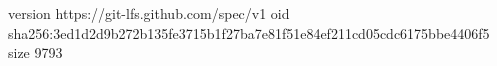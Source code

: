 version https://git-lfs.github.com/spec/v1
oid sha256:3ed1d2d9b272b135fe3715b1f27ba7e81f51e84ef211cd05cdc6175bbe4406f5
size 9793
